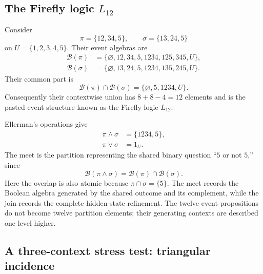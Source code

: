 \documentclass[aps,pra,reprint,nofootinbib]{revtex4-2}
\newcommand{\BA}{\mathcal{B}}
\begin{document}
\subsection{The Firefly logic \texorpdfstring{$L_{12}$}{L12}}

Consider
\begin{equation}
  \pi=\{12,34,5\},\qquad
  \sigma=\{13,24,5\}
  \label{eq:firefly-partitions}
\end{equation}
on $U=\{1,2,3,4,5\}$.  Their event algebras are
\begin{align}
  \BA(\pi)
  &=\{\varnothing,12,34,5,1234,125,345,U\},
  \label{eq:firefly-ba-pi}\\
  \BA(\sigma)
  &=\{\varnothing,13,24,5,1234,135,245,U\}.
  \label{eq:firefly-ba-sigma}
\end{align}
Their common part is
\begin{equation}
  \BA(\pi)\cap\BA(\sigma)
  =\{\varnothing,5,1234,U\}.
  \label{eq:firefly-overlap}
\end{equation}
Consequently their contextwise union has $8+8-4=12$ elements and is the pasted
event structure known as the Firefly logic $L_{12}$.

Ellerman's operations give
\begin{align}
  \pi\wedge\sigma&=\{1234,5\},
  \label{eq:firefly-meet}\\
  \pi\vee\sigma&=1_U.
  \label{eq:firefly-join}
\end{align}
The meet is the partition representing the shared binary question ``$5$ or
not $5$,'' since
\begin{equation}
  \BA(\pi\wedge\sigma)
  =\BA(\pi)\cap\BA(\sigma).
\end{equation}
Here the overlap is also atomic because $\pi\cap\sigma=\{5\}$.  The meet
records the Boolean algebra generated by the shared outcome and its
complement, while the join records the complete hidden-state refinement.  The
twelve event propositions do not become twelve partition elements; their
generating contexts are described one level higher.

\subsection{A three-context stress test: triangular incidence}
\label{sec:triangle}
\end{document}
